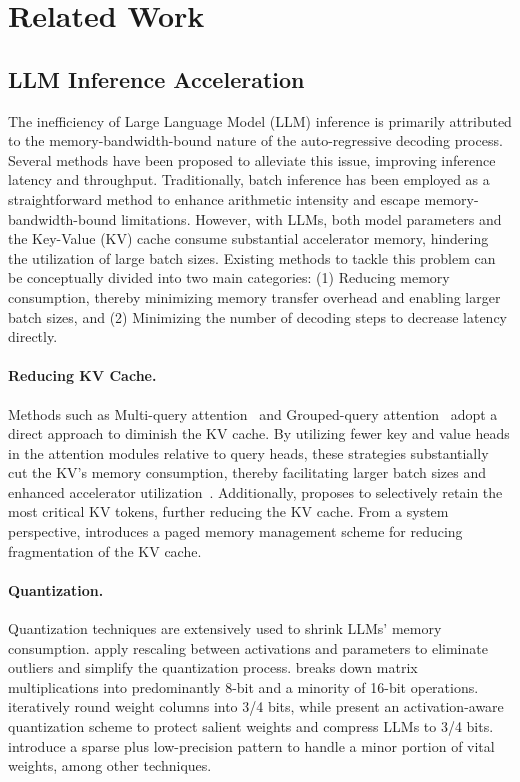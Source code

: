 \section{Related Work}\label{sec:related_work}
\subsection{LLM Inference Acceleration}
The inefficiency of Large Language Model (LLM) inference is primarily attributed to the memory-bandwidth-bound nature of the auto-regressive decoding process. Several methods have been proposed to alleviate this issue, improving inference latency and throughput. Traditionally, batch inference has been employed as a straightforward method to enhance arithmetic intensity and escape memory-bandwidth-bound limitations. However, with LLMs, both model parameters and the Key-Value (KV) cache consume substantial accelerator memory, hindering the utilization of large batch sizes. Existing methods to tackle this problem can be conceptually divided into two main categories: (1) Reducing memory consumption, thereby minimizing memory transfer overhead and enabling larger batch sizes, and (2) Minimizing the number of decoding steps to decrease latency directly.

\paragraph{Reducing KV Cache.} Methods such as Multi-query attention~\citep{shazeer2019fast} and Grouped-query attention~\citep{ainslie2023gqa} adopt a direct approach to diminish the KV cache. By utilizing fewer key and value heads in the attention modules relative to query heads, these strategies substantially cut the KV's memory consumption, thereby facilitating larger batch sizes and enhanced accelerator utilization~\citep{pope2022efficiently}. Additionally, \citet{zhang2023h} proposes to selectively retain the most critical KV tokens, further reducing the KV cache. From a system perspective, \citet{kwon2023efficient} introduces a paged memory management scheme for reducing fragmentation of the KV cache.

\paragraph{Quantization.} Quantization techniques are extensively used to shrink LLMs' memory consumption. \citet{xiao2023smoothquant} apply rescaling between activations and parameters to eliminate outliers and simplify the quantization process. \citet{dettmers2022llm} breaks down matrix multiplications into predominantly 8-bit and a minority of 16-bit operations. \citet{frantar2022gptq} iteratively round weight columns into 3/4 bits, while \citet{lin2023awq} present an activation-aware quantization scheme to protect salient weights and compress LLMs to 3/4 bits. \citet{kim2023squeezellm} introduce a sparse plus low-precision pattern to handle a minor portion of vital weights, among other techniques.

